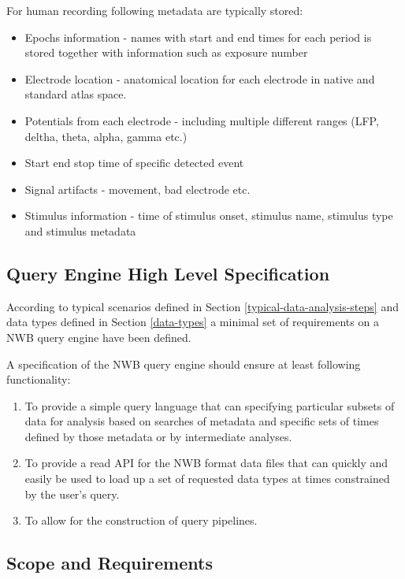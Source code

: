 \documentclass[utf8]{frontiersSCNS} %
\begin{document}
For human recording following metadata are typically stored:

\begin{itemize}
 \item Epochs information - names with start and end times for each period is stored together with information such as exposure number
 \item Electrode location - anatomical location for each electrode in native and standard atlas space.
 \item Potentials from each electrode - including multiple different ranges (LFP, deltha, theta, alpha, gamma etc.)
 \item Start end stop time of specific detected event
 \item Signal artifacts - movement, bad electrode etc.
 \item Stimulus information - time of stimulus onset, stimulus name, stimulus type and stimulus metadata
\end{itemize}



\subsection{Query Engine High Level Specification}
\label{Query_engine_specification}

According to typical scenarios defined in Section \ref{typical-data-analysis-steps} and data types defined in Section \ref{data-types} a minimal set of requirements on a NWB query engine have been defined.

A specification of the NWB query engine should ensure at least following functionality:
\begin{enumerate}
 \item To provide a simple query language that can specifying particular subsets of data for analysis based on searches of metadata and specific sets of times defined by those metadata or by intermediate analyses.
 \item To provide a read API for the NWB format data files that can quickly and easily be used to load up a set of requested data types at times constrained by the user’s query.
 \item To allow for the construction of query pipelines.
\end{enumerate}


\subsection{Scope and Requirements}
\label{Scope_and_requirements}
\end{document}
